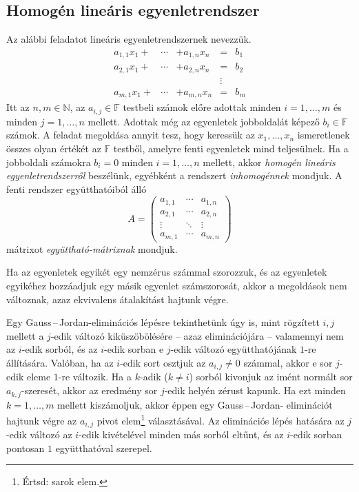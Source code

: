 \documentclass[9pt, a4paper, showtrims]{memoir}
\theoremstyle{plain}
\theoremstyle{remark}
\theoremstyle{definition}
\begin{document}
\subsection{Homogén lineáris egyenletrendszer}
Az alábbi feladatot lineáris egyenletrendszernek nevezzük.
\[
	\begin{array}{rrlcl}
		a_{1,1}x_1+ & \cdots & +a_{1,n}x_n & =      & b_1 \\
		a_{2,1}x_1+ & \cdots & +a_{2,n}x_n & =      & b_2 \\
		            &        &             & \vdots &     \\
		a_{m,1}x_1+ & \cdots & +a_{m,n}x_n & =      & b_m
	\end{array}
\]
Itt az $n,m\in\mathbb{N}$, az $a_{i,j}\in\mathbb{F}$ testbeli számok előre adottak
minden $i=1,\ldots,m$ és minden $j=1,\ldots,n$ mellett.
Adottak még az egyenletek jobboldalát képező $b_i\in\mathbb{F}$ számok.
A feladat megoldása annyit tesz, hogy keressük az $x_1,\ldots,x_n$ ismeretlenek
összes olyan értékét az $\mathbb{F}$ testből,
amelyre fenti egyenletek mind teljesülnek.
Ha a jobboldali számokra $b_i=0$ minden $i=1,\ldots,n$ mellett,
akkor
\emph{homogén lineáris egyenletrendszerről}%
beszélünk,
egyébként a rendszert
\emph{inhomogénnek}%
mondjuk.
A fenti rendszer együtthatóiból álló
\[
	A=
	\begin{pmatrix}
		a_{1,1} & \cdots & a_{1,n} \\
		a_{2,1} & \cdots & a_{2,n} \\
		\vdots  & \ddots & \vdots  \\
		a_{m,1} & \cdots & a_{m,n}
	\end{pmatrix}
\]
mátrixot
\emph{együttható-mátrixnak}%
mondjuk.

Ha az egyenletek egyikét egy nemzérus számmal szorozzuk,
és az egyenletek egyikéhez hozzáadjuk egy másik egyenlet számszorosát,
akkor a megoldások nem változnak,
azaz ekvivalens átalakítást hajtunk végre.

Egy Gauss\,--\,Jordan-eliminációs  lépésre tekinthetünk úgy is,
mint rögzített $i,j$ mellett a $j$-edik változó kiküszöbölésére
-- azaz eliminációjára --
valamennyi nem az $i$-edik sorból,
és az $i$-edik sorban e $j$-edik változó együtthatójának $1$-re állítására.
Valóban,
ha az $i$-edik sort osztjuk az $a_{i,j}\neq 0$ számmal, akkor e sor $j$-edik
eleme $1$-re változik.
Ha a $k$-adik ($k\neq i$) sorból kivonjuk az imént normált sor
$a_{k,j}$-szeresét, akkor az eredmény sor $j$-edik helyén zérust kapunk.
Ha ezt minden $k=1,\ldots,m$ mellett kiszámoljuk, akkor éppen egy Gauss\,--\,Jordan-%
eliminációt hajtunk végre az $a_{i,j}$ pivot elem\footnote{Értsd: sarok elem.} választásával.
Az eliminációs lépés hatására az $j$-edik változó az $i$-edik kivételével
minden más sorból eltűnt, és az $i$-edik sorban pontosan $1$ együtthatóval szerepel.
\end{document}
